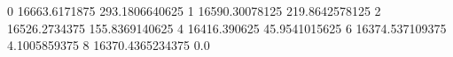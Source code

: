0 16663.6171875 293.1806640625
1 16590.30078125 219.8642578125
2 16526.2734375 155.8369140625
4 16416.390625 45.9541015625
6 16374.537109375 4.1005859375
8 16370.4365234375 0.0
